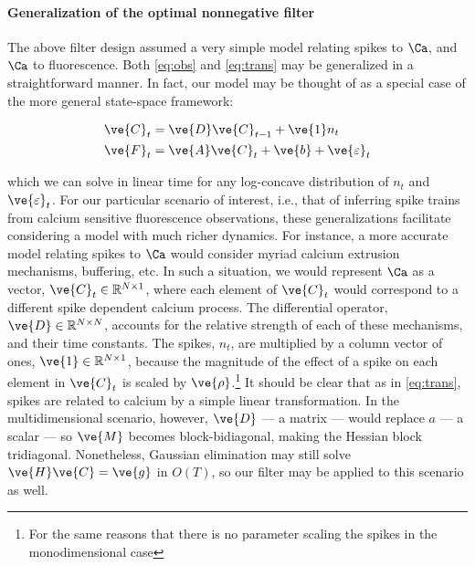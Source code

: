 \documentclass[12pt]{article}
\begin{document}
\paragraph{Generalization of the optimal nonnegative filter}

The above filter design assumed a very simple model relating spikes to $\Ca$, and $\Ca$ to fluorescence.  Both \eqref{eq:obs} and \eqref{eq:trans} may be generalized in a straightforward manner. In fact, our model may be thought of as a special case of the more general state-space framework:

\begin{subequations} \label{eq:SS}
\begin{align}
\ve{C}_t &= \ve{D} \ve{C}_{t-1} + \ve{1} n_t \label{eq:SSa} \\
\ve{F}_t &= \ve{A} \ve{C}_t + \ve{b} + \ve{\varepsilon}_t \label{eq:SSb}
\end{align}
\end{subequations}

\noindent which we can solve in linear time for any log-concave distribution of $n_t$ and $\ve{\varepsilon}_t$.  For our particular scenario of interest, i.e., that of inferring spike trains from calcium sensitive fluorescence observations, these generalizations facilitate considering a model with much richer dynamics.  For instance, a more accurate model relating spikes to $\Ca$ would consider myriad calcium extrusion mechanisms, buffering, etc. In such a situation, we would represent $\Ca$ as a vector, $\ve{C}_t \in \mathbb{R}^{N \times 1}$, where each element of $\ve{C}_t$ would correspond 
%
%
%
to a different spike dependent calcium process. The differential operator, $\ve{D} \in \mathbb{R}^{N \times N}$, accounts for the relative strength of each of these mechanisms, and their time constants. The spikes, $n_t$, are multiplied by a column vector of ones, $\ve{1} \in \mathbb{R}^{N \times 1}$, because the magnitude of the effect of a spike on each element in $\ve{C}_t$ is scaled by $\ve{\rho}$.\footnote{For the same reasons that there is no parameter scaling the spikes in the monodimensional case} It should be clear that as in \eqref{eq:trans}, spikes are related to calcium by a simple linear transformation.  In the multidimensional scenario, however, $\ve{D}$ --- a matrix --- would replace $a$ --- a scalar ---  so $\ve{M}$ becomes block-bidiagonal, making the Hessian block tridiagonal.  Nonetheless, Gaussian elimination may still solve $\ve{H}\ve{C}=\ve{g}$ in $O(T)$, so our filter may be applied to this scenario as well.
\end{document}
